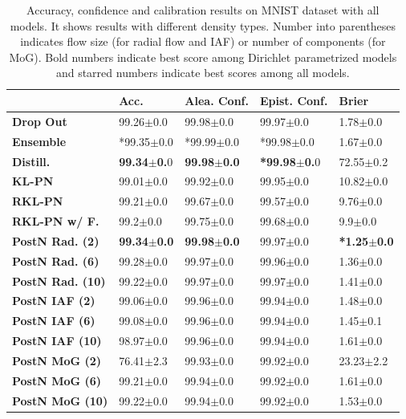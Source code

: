 \begin{table}[ht]
\centering
\begin{tabular}{lllll}
\toprule
{} &   \textbf{Acc.} & \textbf{Alea. Conf.} & \textbf{Epist. Conf.}  &  \textbf{Brier} \\
\midrule
\midrule
\textbf{Drop Out       } &  99.26$\pm$0.0 &       99.98$\pm$0.0 &         99.97$\pm$0.0 &   1.78$\pm$0.0 \\
\textbf{Ensemble       } &  *99.35$\pm$0.0 &       *99.99$\pm$0.0 &         *99.98$\pm$0.0 &   1.67$\pm$0.0 \\
\midrule
\textbf{Distill.       } &  \textbf{99.34$\pm$0.}0 &       \textbf{99.98$\pm$0.0} &         \textbf{*99.98$\pm$0.}0 &  72.55$\pm$0.2 \\
\textbf{KL-PN          } &  99.01$\pm$0.0 &       99.92$\pm$0.0 &         99.95$\pm$0.0 &  10.82$\pm$0.0 \\
\textbf{RKL-PN         } &  99.21$\pm$0.0 &       99.67$\pm$0.0 &         99.57$\pm$0.0 &   9.76$\pm$0.0 \\
\textbf{RKL-PN w/ F.   } &   99.2$\pm$0.0 &       99.75$\pm$0.0 &         99.68$\pm$0.0 &    9.9$\pm$0.0 \\
\textbf{PostN Rad. (2) } &  \textbf{99.34$\pm$0.0} &       \textbf{99.98$\pm$0.0} &         99.97$\pm$0.0 &   \textbf{*1.25$\pm$0.0} \\
\textbf{PostN Rad. (6) } &  99.28$\pm$0.0 &       99.97$\pm$0.0 &         99.96$\pm$0.0 &   1.36$\pm$0.0 \\
\textbf{PostN Rad. (10)} &  99.22$\pm$0.0 &       99.97$\pm$0.0 &         99.97$\pm$0.0 &   1.41$\pm$0.0 \\
\textbf{PostN IAF (2)  } &  99.06$\pm$0.0 &       99.96$\pm$0.0 &         99.94$\pm$0.0 &   1.48$\pm$0.0 \\
\textbf{PostN IAF (6)  } &  99.08$\pm$0.0 &       99.96$\pm$0.0 &         99.94$\pm$0.0 &   1.45$\pm$0.1 \\
\textbf{PostN IAF (10) } &  98.97$\pm$0.0 &       99.96$\pm$0.0 &         99.94$\pm$0.0 &   1.61$\pm$0.0 \\
\textbf{PostN MoG (2)  } &  76.41$\pm$2.3 &       99.93$\pm$0.0 &         99.92$\pm$0.0 &  23.23$\pm$2.2 \\
\textbf{PostN MoG (6)  } &  99.21$\pm$0.0 &       99.94$\pm$0.0 &         99.92$\pm$0.0 &   1.61$\pm$0.0 \\
\textbf{PostN MoG (10) } &  99.22$\pm$0.0 &       99.94$\pm$0.0 &         99.92$\pm$0.0 &   1.53$\pm$0.0 \\
\bottomrule
\end{tabular}
    \caption{Accuracy, confidence and calibration results on MNIST dataset with all models. It shows results with different density types. Number into parentheses indicates flow size (for radial flow and IAF) or number of components (for MoG). Bold numbers indicate best score among Dirichlet parametrized models and starred numbers indicate best scores among all models.}
    \label{fig:unc_MNIST_full}
\end{table}

